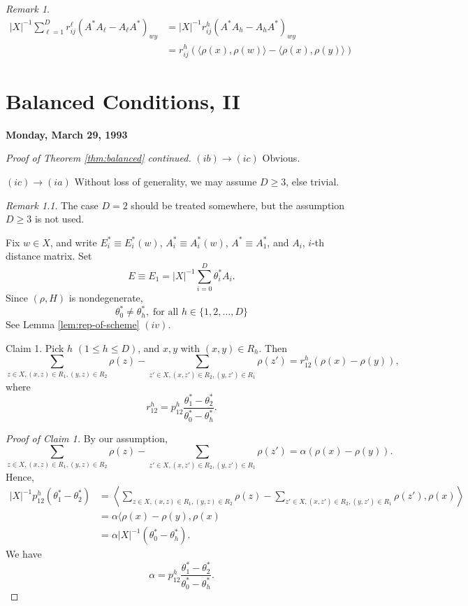 \documentclass[
]{book}
\theoremstyle{definition}
\theoremstyle{definition}
\theoremstyle{definition}
\theoremstyle{definition}
\theoremstyle{remark}
\newtheorem*{remark}{Remark}
\begin{document}
\begin{remark}
\begin{align}
|X|^{-1}\sum_{\ell=1}^D r^\ell_{ij}(A^*A_\ell - A_\ell A^*)_{wy} & = |X|^{-1}r^h_{ij}(A^*A_h- A_hA^*)_{wy}\\
& = r^h_{ij}(\langle \rho(x),\rho(w)\rangle - \langle \rho(x),\rho(y)\rangle)
\end{align}
\end{remark}

\hypertarget{lec25}{%
\chapter{Balanced Conditions, II}\label{lec25}}

\textbf{Monday, March 29, 1993}

\begin{proof}[Proof of Theorem \ref{thm:balanced} continued]
\leavevmode

\((ib)\to(ic)\) Obvious.

\((ic)\to(ia)\) Without loss of generality, we may assume \(D\geq 3\), else trivial.

\begin{remark}
The case \(D = 2\) should be treated somewhere, but the assumption \(D\geq 3\) is not used.
\end{remark}

Fix \(w\in X\), and write \(E^*_i \equiv E^*_i(w)\), \(A^*_i\equiv A^*_i(w)\), \(A^*\equiv A^*_1\), and \(A_i\), \(i\)-th distance matrix. Set
\[E \equiv E_1 = |X|^{-1}\sum_{i=0}^D \theta^*_i A_i.\]
Since \((\rho, H)\) is nondegenerate,
\[\theta^*_0 \neq \theta^*_h, \; \text{for all }h\in \{1,2,\ldots, D\}\]
See Lemma \ref{lem:rep-of-scheme} \((iv)\).

Claim 1. Pick \(h\) \((1\leq h\leq D)\), and \(x,y\) with \((x,y)\in R_h\). Then
\[\sum_{z\in X, (x,z)\in R_1, (y,z)\in R_2}\rho(z) - \sum_{z'\in X, (x,z')\in R_2, (y,z')\in R_1}\rho(z') = r^h_{12}(\rho(x)-\rho(y)),\]
where
\[r^h_{12} = p^h_{12}\frac{\theta_1^* - \theta^*_2}{\theta^*_0-\theta^*_h}.\]

\emph{Proof of Claim 1.}
By our assumption,
\[\sum_{z\in X, (x,z)\in R_1, (y,z)\in R_2}\rho(z) - \sum_{z'\in X, (x,z')\in R_2, (y,z')\in R_1}\rho(z') = \alpha(\rho(x)-\rho(y)).\]
Hence,
\begin{align}
|X|^{-1}p^h_{12}(\theta^*_1-\theta^*_2) & = \left\langle \sum_{z\in X, (x,z)\in R_1, (y,z)\in R_2}\rho(z) - \sum_{z'\in X, (x,z')\in R_2, (y,z')\in R_1}\rho(z'), \rho(x)\right\rangle \\
& = \alpha\langle \rho(x)-\rho(y), \rho(x)\\
& = \alpha |X|^{-1}(\theta_0^*-\theta^*_h).
\end{align}
We have
\[\alpha = p^h_{12}\frac{\theta_1^* - \theta^*_2}{\theta^*_0-\theta^*_h}.\]


\end{proof}
\end{document}
